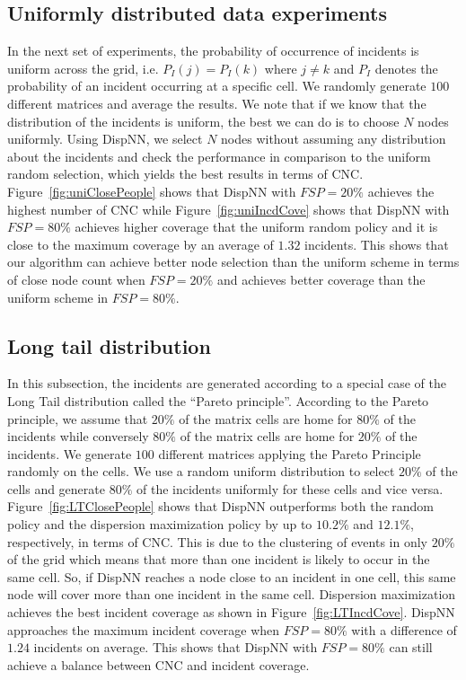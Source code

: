 \documentclass{acm_proc_article-sp}
\begin{document}
\subsection{Uniformly distributed data experiments}
In the next set of experiments, the probability of occurrence of incidents is uniform across the grid, i.e. $P_I (j) = P_I (k)$ where $j \neq k$ and $P_I$ denotes the probability of an incident occurring at a specific cell. We randomly generate $100$ different matrices and average the results. We note that if we know that the distribution of the incidents is uniform, the best we can do is to choose $N$ nodes uniformly. Using DispNN, we select $N$ nodes without assuming any distribution about the incidents and check the performance in comparison to the uniform random selection, which yields the best results in terms of CNC. Figure~\ref{fig:uniClosePeople} shows that DispNN with $FSP = 20\%$ achieves the highest number of CNC while Figure~\ref{fig:uniIncdCove} shows that DispNN with $FSP = 80\%$ achieves higher coverage that the uniform random policy and it is close to the maximum coverage by an average of $1.32$ incidents. This shows that our algorithm can achieve better node selection than the uniform scheme in terms of close node count when $FSP = 20\%$ and achieves better coverage than the uniform scheme in $FSP = 80\%$.




\subsection{Long tail distribution}
In this subsection, the incidents are generated according to a special case of the Long Tail distribution called the ``Pareto principle''. According to the Pareto principle, we assume that $20\%$ of the matrix cells are home for $80\%$ of the incidents while conversely $80\%$ of the matrix cells are home for $20\%$ of the incidents. We generate $100$ different matrices applying the Pareto Principle randomly on the cells. We use a random uniform distribution to select $20\%$ of the cells and generate $80\%$ of the incidents uniformly for these cells and vice versa. Figure~\ref{fig:LTClosePeople} shows that DispNN outperforms both the random policy and the dispersion maximization policy by up to $10.2\%$ and $12.1\%$, respectively, in terms of CNC. This is due to the clustering of events in only $20\%$ of the grid which means that more than one incident is likely to occur in the same cell. So, if DispNN reaches a node close to an incident in one cell, this same node will cover more than one incident in the same cell. Dispersion maximization achieves the best incident coverage as shown in Figure~\ref{fig:LTIncdCove}. DispNN approaches the maximum incident coverage when $FSP = 80\%$ with a difference of $1.24$ incidents on average. This shows that DispNN with $FSP = 80\%$ can still achieve a balance between CNC and incident coverage.
\end{document}

